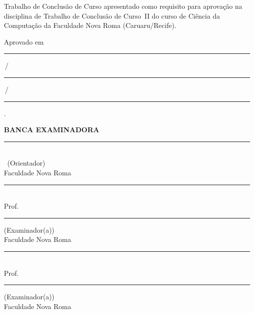 \begingroup
\singlespacing
\begin{center}
\vspace*{1.2cm}

{\bfseries \tccautor}

\vfill

{\large\bfseries \tcctitulo}
\end{center}

\vspace{1.0cm}

\hspace*{7cm}\begin{minipage}{7.5cm}
\singlespacing\small
Trabalho de Conclusão de Curso apresentado como requisito para aprovação na
disciplina de Trabalho de Conclusão de Curso~II do curso de Ciência da
Computação da Faculdade Nova Roma (Caruaru/Recife).
\end{minipage}

\vspace{1.4cm}
\noindent Aprovado em \rule{1.2cm}{0.4pt}\,/\,\rule{1.2cm}{0.4pt}\,/\,\rule{1.8cm}{0.4pt}.

\vspace{1.6cm}
\begin{center}
{\bfseries BANCA EXAMINADORA}
\end{center}

\vspace{1.4cm}
\begin{center}
\rule{10cm}{0.4pt}\\
\tccorientador\ (Orientador)\\
Faculdade Nova Roma

\vspace{1.4cm}
\rule{10cm}{0.4pt}\\
Prof.\ \rule{5cm}{0.4pt} (Examinador(a))\\
Faculdade Nova Roma

\vspace{1.4cm}
\rule{10cm}{0.4pt}\\
Prof.\ \rule{5cm}{0.4pt} (Examinador(a))\\
Faculdade Nova Roma
\end{center}

\vfill
\endgroup
\newpage
